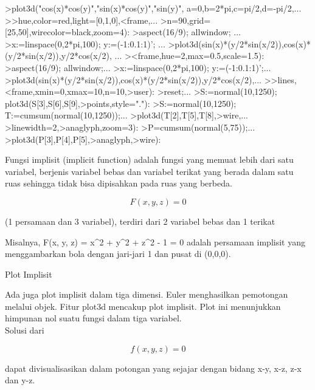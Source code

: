 \documentclass[a4paper,10pt]{article}
\begin{document}
\begin{eulernotebook}
\begin{eulercomment}
\begin{eulercomment}
\begin{eulercomment}
\begin{eulercomment}
\begin{eulercomment}
\begin{eulercomment}
\begin{eulercomment}
\begin{eulercomment}
\begin{eulercomment}
\begin{eulercomment}
\begin{eulercomment}
\begin{eulercomment}
\begin{eulercomment}
\end{eulercomment}
\begin{eulerprompt}
>plot3d("cos(x)*cos(y)","sin(x)*cos(y)","sin(y)", a=0,b=2*pi,c=pi/2,d=-pi/2,...
>>hue,color=red,light=[0,1,0],<frame,...
>n=90,grid=[25,50],wirecolor=black,zoom=4):
>aspect(16/9); allwindow; ...
>x:=linspace(0,2*pi,100); y:=(-1:0.1:1)'; ...
>plot3d(sin(x)*(y/2*sin(x/2)),cos(x)*(y/2*sin(x/2)),y/2*cos(x/2), ...
><frame,hue=2,max=0.5,scale=1.5):
>aspect(16/9); allwindow;...
>x:=linspace(0,2*pi,100); y:=(-1:0.1:1)';...
>plot3d(sin(x)*(y/2*sin(x/2)),cos(x)*(y/2*sin(x/2)),y/2*cos(x/2),...
>>lines,<frame,xmin=0,xmax=10,n=10,>user):
>reset;...
>S:=normal(10,1250); plot3d(S[3],S[6],S[9],>points,style="."):
>S:=normal(10,1250); T:=cumsum(normal(10,1250));...
>plot3d(T[2],T[5],T[8],>wire,...
>linewidth=2,>anaglyph,zoom=3):
>P=cumsum(normal(5,75));...
>plot3d(P[3],P[4],P[5],>anaglyph,>wire):
\end{eulerprompt}
\begin{eulercomment}
Fungsi implisit (implicit function) adalah fungsi yang memuat lebih
dari satu variabel, berjenis variabel bebas dan variabel terikat yang
berada dalam satu ruas sehingga tidak bisa dipisahkan pada ruas yang
berbeda.

\end{eulercomment}
\begin{eulerformula}
\[
F(x,y,z)=0
\]
\end{eulerformula}
\begin{eulercomment}
(1 persamaan dan 3 variabel), terdiri dari 2 variabel bebas dan 1
terikat

Misalnya, F(x, y, z) = x\textasciicircum{}2 + y\textasciicircum{}2 + z\textasciicircum{}2 - 1 = 0 adalah persamaan
implisit yang menggambarkan bola dengan jari-jari 1 dan pusat di
(0,0,0).

Plot Implisit

Ada juga plot implisit dalam tiga dimensi. Euler menghasilkan
pemotongan melalui objek. Fitur plot3d mencakup plot implisit. Plot
ini menunjukkan himpunan nol suatu fungsi dalam tiga variabel.\\
Solusi dari



\end{eulercomment}
\begin{eulerformula}
\[
f(x,y,z) = 0
\]
\end{eulerformula}
\begin{eulercomment}
dapat divisualisasikan dalam potongan yang sejajar dengan bidang x-y,
x-z, z-x dan y-z.


\end{eulercomment}
\end{eulercomment}
\end{eulercomment}
\end{eulercomment}
\end{eulercomment}
\end{eulercomment}
\end{eulercomment}
\end{eulercomment}
\end{eulercomment}
\end{eulercomment}
\end{eulercomment}
\end{eulercomment}
\end{eulercomment}
\end{eulernotebook}
\end{document}
